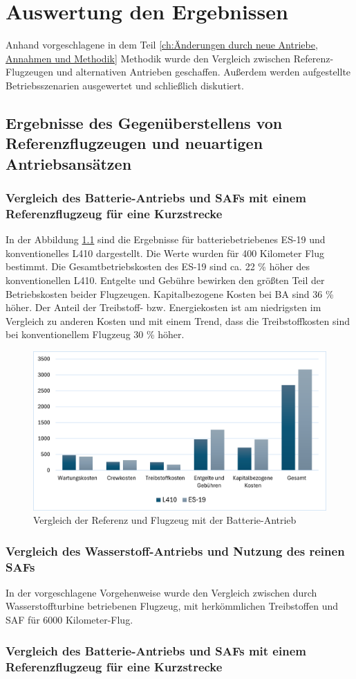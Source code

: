 \chapter{Auswertung den Ergebnissen}
\label{ch:Auswertung den Ergebnissen}
Anhand vorgeschlagene in dem Teil \ref{ch:Änderungen durch neue Antriebe, Annahmen und Methodik} Methodik wurde den Vergleich zwischen Referenz-Flugzeugen und alternativen Antrieben geschaffen.
Außerdem werden aufgestellte Betriebsszenarien ausgewertet und schließlich diskutiert.

\section{Ergebnisse des Gegenüberstellens von Referenzflugzeugen und neuartigen Antriebsansätzen}
%
\subsection{Vergleich des Batterie-Antriebs und SAFs mit einem Referenzflugzeug für eine Kurzstrecke}
%
In der Abbildung \ref{vergleichBA_Ref} sind die Ergebnisse für batteriebetriebenes ES-19 und konventionelles L410 dargestellt.
Die Werte wurden für 400 Kilometer Flug bestimmt.
Die Gesamtbetriebskosten des ES-19 sind ca. 22 \% höher des konventionellen L410. Entgelte und Gebühre bewirken den größten Teil der Betriebskosten
beider Flugzeugen. Kapitalbezogene Kosten bei BA sind 36 \% höher. Der Anteil der Treibstoff- bzw. Energiekosten ist am niedrigsten 
im Vergleich zu anderen Kosten und mit einem Trend, dass die Treibstoffkosten sind bei konventionellem Flugzeug 30 \% höher.
\begin{figure}[h]
	\centering
	\includegraphics[width=0.9\linewidth]{Bilder/VergleichBA_Ref.png}
	\caption[Betriebskosten]{Vergleich der Referenz und Flugzeug mit der Batterie-Antrieb}
	\label{vergleichBA_Ref}
\end{figure}

\subsection{Vergleich des Wasserstoff-Antriebs und Nutzung des reinen SAFs}
In der vorgeschlagene Vorgehenweise wurde den Vergleich zwischen durch Wasserstoffturbine betriebenen Flugzeug, mit herkömmlichen Treibstoffen und SAF für
6000 Kilometer-Flug.

\subsection{Vergleich des Batterie-Antriebs und SAFs mit einem Referenzflugzeug für eine Kurzstrecke}